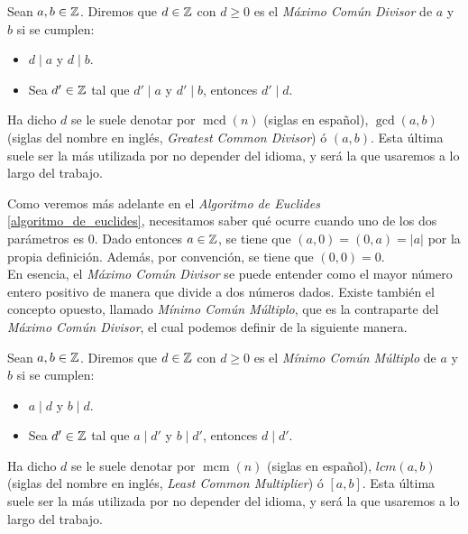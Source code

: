 \begin{definicion}
	Sean $a, b \in \mathbb{Z}$. Diremos que $d \in \mathbb{Z}$ con $d \geq 0$ es el \textit{Máximo Común Divisor} de $a$ y $b$ si se cumplen:
	
	\begin{itemize}
		\item $d \mid a$ y $d \mid b$.
		
		\item Sea $d' \in \mathbb{Z}$ tal que $d' \mid a$ y $d' \mid b$, entonces $d' \mid d$.
	\end{itemize} 
	
	Ha dicho $d$ se le suele denotar por $\mathop{mcd}(n)$ (siglas en español), $\gcd(a, b)$ (siglas del nombre en inglés, \textit{Greatest Common Divisor}) ó $(a, b)$. Esta última suele ser la más utilizada por no depender del idioma, y será la que usaremos a lo largo del trabajo.
\end{definicion}

Como veremos más adelante en el \textit{Algoritmo de Euclides} \autoref{algoritmo_de_euclides}, necesitamos saber qué ocurre cuando uno de los dos parámetros es $0$. Dado entonces $a \in \mathbb{Z}$, se tiene que $(a, 0) = (0, a) = |a|$ por la propia definición. Además, por convención, se tiene que $(0, 0) = 0$.\\

En esencia, el \textit{Máximo Común Divisor} se puede entender como el mayor número entero positivo de manera que divide a dos números dados. Existe también el concepto opuesto, llamado \textit{Mínimo Común Múltiplo}, que es la contraparte del \textit{Máximo Común Divisor}, el cual podemos definir de la siguiente manera.

\begin{definicion}
	Sean $a, b \in \mathbb{Z}$. Diremos que $d \in \mathbb{Z}$ con $d \geq 0$ es el \textit{Mínimo Común Múltiplo} de $a$ y $b$ si se cumplen:
	
	\begin{itemize}
		\item $a \mid d$ y $b \mid d$.
		
		\item Sea $d' \in \mathbb{Z}$ tal que $a \mid d'$ y $b \mid d'$, entonces $d \mid d'$.
	\end{itemize} 
	
	Ha dicho $d$ se le suele denotar por $\mathop{mcm}(n)$ (siglas en español), $lcm(a, b)$ (siglas del nombre en inglés, \textit{Least Common Multiplier}) ó $[a, b]$. Esta última suele ser la más utilizada por no depender del idioma, y será la que usaremos a lo largo del trabajo.
\end{definicion}

